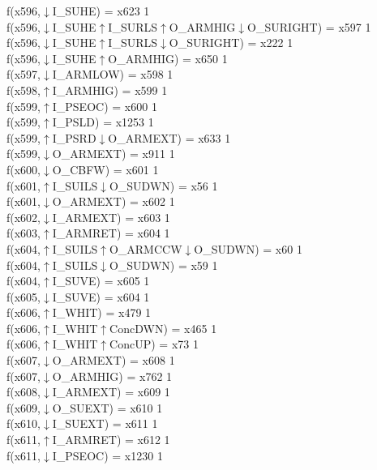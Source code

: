 f(x596,$\downarrow$I\_SUHE) = x623 {1} \\
f(x596,$\downarrow$I\_SUHE$\uparrow$I\_SURLS$\uparrow$O\_ARMHIG$\downarrow$O\_SURIGHT) = x597 {1} \\
f(x596,$\downarrow$I\_SUHE$\uparrow$I\_SURLS$\downarrow$O\_SURIGHT) = x222 {1} \\
f(x596,$\downarrow$I\_SUHE$\uparrow$O\_ARMHIG) = x650 {1} \\
f(x597,$\downarrow$I\_ARMLOW) = x598 {1} \\
f(x598,$\uparrow$I\_ARMHIG) = x599 {1} \\
f(x599,$\uparrow$I\_PSEOC) = x600 {1} \\
f(x599,$\uparrow$I\_PSLD) = x1253 {1} \\
f(x599,$\uparrow$I\_PSRD$\downarrow$O\_ARMEXT) = x633 {1} \\
f(x599,$\downarrow$O\_ARMEXT) = x911 {1} \\
f(x600,$\downarrow$O\_CBFW) = x601 {1} \\
f(x601,$\uparrow$I\_SUILS$\downarrow$O\_SUDWN) = x56 {1} \\
f(x601,$\downarrow$O\_ARMEXT) = x602 {1} \\
f(x602,$\downarrow$I\_ARMEXT) = x603 {1} \\
f(x603,$\uparrow$I\_ARMRET) = x604 {1} \\
f(x604,$\uparrow$I\_SUILS$\uparrow$O\_ARMCCW$\downarrow$O\_SUDWN) = x60 {1} \\
f(x604,$\uparrow$I\_SUILS$\downarrow$O\_SUDWN) = x59 {1} \\
f(x604,$\uparrow$I\_SUVE) = x605 {1} \\
f(x605,$\downarrow$I\_SUVE) = x604 {1} \\
f(x606,$\uparrow$I\_WHIT) = x479 {1} \\
f(x606,$\uparrow$I\_WHIT$\uparrow$ConcDWN) = x465 {1} \\
f(x606,$\uparrow$I\_WHIT$\uparrow$ConcUP) = x73 {1} \\
f(x607,$\downarrow$O\_ARMEXT) = x608 {1} \\
f(x607,$\downarrow$O\_ARMHIG) = x762 {1} \\
f(x608,$\downarrow$I\_ARMEXT) = x609 {1} \\
f(x609,$\downarrow$O\_SUEXT) = x610 {1} \\
f(x610,$\downarrow$I\_SUEXT) = x611 {1} \\
f(x611,$\uparrow$I\_ARMRET) = x612 {1} \\
f(x611,$\downarrow$I\_PSEOC) = x1230 {1} \\
